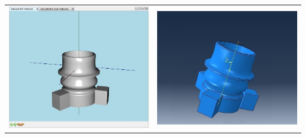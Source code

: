 \documentclass[14pt,oneside,final]{extreport}
\begin{document}
\begin{table}[]
{{\begin{tabu}[]{|c|c|}
				\includegraphics[scale=0.40]{img/loader-test2} & \includegraphics[scale=0.43]{img/loader-test2-abq} \\ 

\end{tabu}}}
\end{table}
\end{document}
